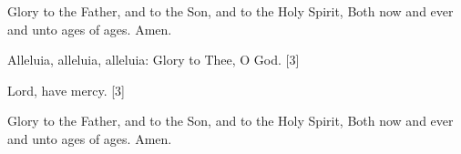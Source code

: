Glory to the Father, and to the Son, and to the Holy Spirit, Both now and ever and unto ages of ages. Amen. 

Alleluia, alleluia, alleluia: Glory to Thee, O  God. [3]

Lord, have mercy. [3]

Glory to the Father, and to the Son, and to the Holy Spirit, Both now and ever and unto ages of ages. Amen.
